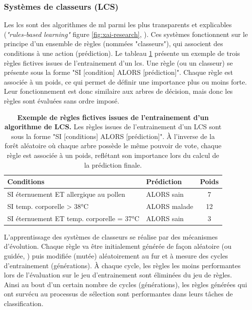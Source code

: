 \subsubsection{Systèmes de classeurs (LCS)}
Les \gls{lcs} sont des algorithmes de \gls{ml} parmi les plus transparents et explicables (\textit{"rules-based learning"} figure \ref{fig:xai-research}, \cite{arrieta_explainable_2019}). Ces systèmes fonctionnent sur le principe d'un ensemble de règles (nommées "classeurs"), qui associent des conditions à une action (prédiction). Le tableau \ref{table:lcs-rules} présente un exemple de trois règles fictives issues de l'entrainement d'un \gls{lcs}. Une règle (ou un classeur) se présente sous la forme "SI [condition] ALORS [prédiction]". Chaque règle est associée à un poids, ce qui permet de définir une importance plus ou moins forte. Leur fonctionnement est donc similaire aux arbres de décision, mais donc les règles sont évaluées sans ordre imposé.
\begin{table}[!htbp]
\centering
\begin{tabular}{|l|l|c|} 
 \hline
 Conditions & Prédiction & Poids \\
 \hline
 SI éternuement ET allergique au pollen & ALORS sain & 7 \\ 
 SI temp. corporelle > 38°C & ALORS malade & 12 \\ 
 SI éternuement ET temp. corporelle = 37°C & ALORS sain & 3 \\ 

 \hline
\end{tabular}
\caption[Exemple de règles fictives issues de l'entrainement d'un algorithme de LCS]{\textbf{Exemple de règles fictives issues de l'entrainement d'un algorithme de LCS.} Les règles issues de l'entrainement d'un LCS sont sous la forme "SI [conditions] ALORS [prédiction]". À l'inverse de la forêt aléatoire où chaque arbre possède le même pouvoir de vote, chaque règle est associée à un poids, reflétant son importance lors du calcul de la prédiction finale.}
\label{table:lcs-rules}
\end{table}

L'apprentissage des systèmes de classeurs se réalise par des mécanismes d'évolution. Chaque règle va être initialement générée de façon aléatoire (ou guidée, \cite{urbanowicz_relief-based_2018}) puis modifiée (mutée) aléatoirement au fur et à mesure des cycles d'entrainement (générations). À chaque cycle, les règles les moins performantes lors de l'évaluation sur le jeu d'entrainement sont éliminées du jeu de règles. Ainsi au bout d'un certain nombre de cycles (générations), les règles générées qui ont survécu au processus de sélection sont performantes dans leurs tâches de classification.

